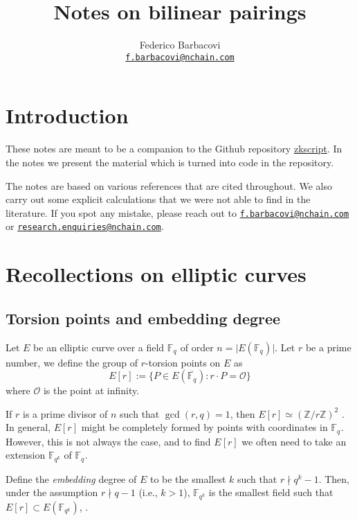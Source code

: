 \documentclass{article}
\title{Notes on bilinear pairings}
\author{Federico Barbacovi \\ \href{mailto:f.barbacovi@nchain.com}{\texttt{f.barbacovi@nchain.com}}}
\newcommand{\fq}[1]{\mathbb{F}_{q^{#1}}}
\newcommand{\cO}{\mathcal{O}}
\theoremstyle{remark}
\theoremstyle{plain}
\begin{document}
\maketitle
\tableofcontents

\section{Introduction}

These notes are meant to be a companion to the Github repository \href{https://github.com/nchain-innovation/zkscript_package}{zkscript}.
In the notes we present the material which is turned into code in the repository.

The notes are based on various references that are cited throughout.
We also carry out some explicit calculations that we were not able to find in the literature.
If you spot any mistake, please reach out to \href{mailto:f.barbacovi@nchain.com}{\texttt{f.barbacovi@nchain.com}} or \href{mailto:research.enquiries@nchain.com}{\texttt{research.enquiries@nchain.com}}.

\section{Recollections on elliptic curves}

\subsection{Torsion points and embedding degree}

Let $E$ be an elliptic curve over a field $\fq{}$ of order $n = \vert E(\fq{}) \vert$.
Let $r$ be a prime number, we define the group of $r$-torsion points on $E$ as
\[
E[r] := \{ P \in E(\overline{\fq{}}): r \cdot P = \cO \}
\]
where $\cO$ is the point at infinity.

If $r$ is a prime divisor of $n$ such that $\gcd(r,q) = 1$, then $E[r] \simeq (\mathbb{Z}/r\mathbb{Z})^2$ \cite{ADC-handbook-ECC}.
In general, $E[r]$ might be completely formed by points with coordinates in $\fq{}$.
However, this is not always the case, and to find $E[r]$ we often need to take an extension $\fq{k}$ of $\fq{}$.

Define the \emph{embedding} degree of $E$ to be the smallest $k$ such that $r \nmid q^k - 1$.
Then, under the assumption $r \nmid q - 1$ (i.e., $k > 1$), $\fq{k}$ is the smallest field such that $E[r] \subset E(\fq{k})$, \cite[Thm. 1]{BK-improbability-ec-subexp-dlog}.
\end{document}
